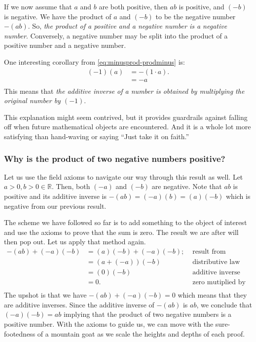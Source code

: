 \documentclass[
  a4paper,
]{article}
\begin{document}
If we now assume that \(a\) and \(b\) are both positive, then \(ab\) is
positive, and \((-b)\) is negative. We have the product of \(a\) and
\((-b)\) to be the negative number \(-(ab)\). So, \emph{the product of a
positive and a negative number is a negative number}. Conversely, a
negative number may be split into the product of a positive number and a
negative number.

One interesting corollary from \cref{eq:minusprod-prodminus} is: \[
\begin{aligned}
(-1)(a) &= -(1 \cdot a).\\
&= -a\\
\end{aligned}
\] This means that \emph{the additive inverse of a number is obtained by
multiplying the original number by \((-1)\)}.

This explanation might seem contrived, but it provides guardrails
against falling off when future mathematical objects are encountered.
And it is a whole lot more satisfying than hand-waving or saying ``Just
take it on faith.''

\hypertarget{why-is-the-product-of-two-negative-numbers-positive}{%
\subsubsection{Why is the product of two negative numbers
positive?}\label{why-is-the-product-of-two-negative-numbers-positive}}

Let us use the field axioms to navigate our way through this result as
well. Let \(a > 0, b > 0 \in \mathbb{R}\). Then, both \((-a)\) and
\((-b)\) are negative. Note that \(ab\) is positive and its additive
inverse is \(-(ab) = (-a)(b) = (a)(-b)\) which is negative from our
previous result.

The scheme we have followed so far is to add something to the object of
interest and use the axioms to prove that the sum is zero. The result we
are after will then pop out. Let us apply that method again. \[
\begin{aligned}
-(ab) + (-a)(-b) &= (a)(-b) + (-a)(-b); & \mbox{ result from previous section}\\
&= (a + (-a))(-b) & \mbox{ distributive law}\\
&= (0)(-b) & \mbox{ additive inverse}\\
&= 0. & \mbox{ zero mutiplied by anything is zero}\\
\end{aligned}
\] The upshot is that we have \(-(ab) + (-a)(-b) = 0\) which means that
they are additive inverses. Since the additive inverse of \(-(ab)\) is
\(ab\), we conclude that \((-a)(-b) = ab\) implying that the product of
two negative numbers is a positive number. With the axioms to guide us,
we can move with the sure-footedness of a mountain goat as we scale the
heights and depths of each proof.
\end{document}
